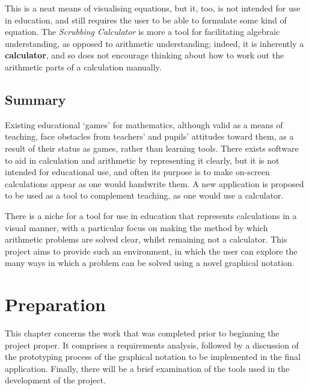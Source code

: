 \documentclass[12pt,twoside,notitlepage,xetex]{report}
\begin{document}
This is a neat means of visualising equations, but it, too, is not intended for use in education, and still requires the user to be able to formulate some kind of equation.  The \emph{Scrubbing Calculator} is more a tool for facilitating algebraic understanding, as opposed to arithmetic understanding; indeed, it is inherently a {\bf calculator}, and so does not encourage thinking about how to work out the arithmetic parts of a calculation manually.

\section{Summary}

Existing educational `games' for mathematics, although valid as a means of teaching, face obstacles from teachers' and pupils' attitudes toward them, as a result of their status as games, rather than learning tools.  There exists software to aid in calculation and arithmetic by representing it clearly, but it is not intended for educational use, and often its purpose is to make on-screen calculations appear as one would handwrite them.  A new application is proposed to be used as a tool to complement teaching, as one would use a calculator.

There is a niche for a tool for use in education that represents calculations in a visual manner, with a particular focus on making the method by which arithmetic problems are solved clear, whilst remaining not a calculator.  This project aims to provide such an environment, in which the user can explore the many ways in which a problem can be solved using a novel graphical notation.%

\cleardoublepage



\chapter{Preparation}

This chapter concerns the work that was completed prior to beginning the
project proper.  It comprises a requirements analysis, followed by a discussion
of the prototyping process of the graphical notation to be implemented in the
final application.  Finally, there will be a brief examination of the tools
used in the development of the project.
\end{document}
